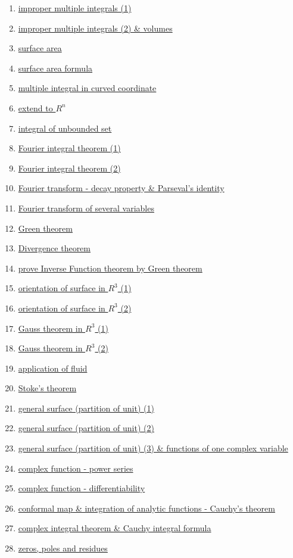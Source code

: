 \documentclass[11pt]{article}
\begin{document}
\begin{enumerate}
	\item \href{URL}{improper multiple integrals (1)}	%
	\item \href{URL}{improper multiple integrals (2) \& volumes}	%
	\item \href{URL}{surface area}	%
	\item \href{URL}{surface area formula}	%
	\item \href{URL}{multiple integral in curved coordinate}	%
	\item \href{URL}{extend to $R^n$}	%
	\item \href{URL}{integral of unbounded set}	%
	\item \href{URL}{Fourier integral theorem (1)}	%
	\item \href{URL}{Fourier integral theorem (2)}	%
	\item \href{URL}{Fourier transform - decay property \& Parseval's identity}	%
	\item \href{URL}{Fourier transform of several variables}	%
	\item \href{URL}{Green theorem}	%
	\item \href{URL}{Divergence theorem}	%
	\item \href{URL}{prove Inverse Function theorem by Green theorem}	%
	\item \href{URL}{orientation of surface in $R^3$ (1)}	%
	\item \href{URL}{orientation of surface in $R^3$ (2)}	%
	\item \href{URL}{Gauss theorem in $R^3$ (1)}	%
	\item \href{URL}{Gauss theorem in $R^3$ (2)}	%
	\item \href{URL}{application of fluid}	%
	\item \href{URL}{Stoke's theorem}	%
	\item \href{URL}{general surface (partition of unit) (1)}	%
	\item \href{URL}{general surface (partition of unit) (2)}	%
	\item \href{URL}{general surface (partition of unit) (3) \& functions of one complex variable}	%
	\item \href{URL}{complex function - power series}	%
	\item \href{URL}{complex function - differentiability}	%
	\item \href{URL}{conformal map \& integration of analytic functions - Cauchy's theorem}	%
	\item \href{URL}{complex integral theorem \& Cauchy integral formula}	%
	\item \href{URL}{zeros, poles and residues}	%
\end{enumerate}
\end{document}
